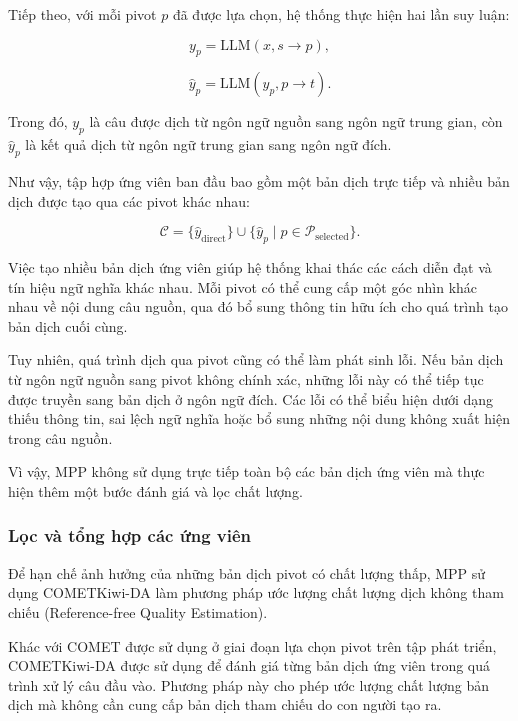 Tiếp theo, với mỗi pivot $p$ đã được lựa chọn, hệ thống thực hiện hai lần suy luận:

\begin{equation}
	y_p
	=
	\mathrm{LLM}(x,s\rightarrow p),
\end{equation}

\begin{equation}
	\hat{y}_p
	=
	\mathrm{LLM}(y_p,p\rightarrow t).
\end{equation}

Trong đó, $y_p$ là câu được dịch từ ngôn ngữ nguồn sang ngôn ngữ trung gian, còn $\hat{y}_p$ là kết quả dịch từ ngôn ngữ trung gian sang ngôn ngữ đích.

Như vậy, tập hợp ứng viên ban đầu bao gồm một bản dịch trực tiếp và nhiều bản dịch được tạo qua các pivot khác nhau:

\begin{equation}
	\mathcal{C}
	=
	\{\hat{y}_{\mathrm{direct}}\}
	\cup
	\{\hat{y}_p\mid p\in\mathcal{P}_{\mathrm{selected}}\}.
\end{equation}

Việc tạo nhiều bản dịch ứng viên giúp hệ thống khai thác các cách diễn đạt và tín hiệu ngữ nghĩa khác nhau. Mỗi pivot có thể cung cấp một góc nhìn khác nhau về nội dung câu nguồn, qua đó bổ sung thông tin hữu ích cho quá trình tạo bản dịch cuối cùng.

Tuy nhiên, quá trình dịch qua pivot cũng có thể làm phát sinh lỗi. Nếu bản dịch từ ngôn ngữ nguồn sang pivot không chính xác, những lỗi này có thể tiếp tục được truyền sang bản dịch ở ngôn ngữ đích. Các lỗi có thể biểu hiện dưới dạng thiếu thông tin, sai lệch ngữ nghĩa hoặc bổ sung những nội dung không xuất hiện trong câu nguồn.

Vì vậy, MPP không sử dụng trực tiếp toàn bộ các bản dịch ứng viên mà thực hiện thêm một bước đánh giá và lọc chất lượng.

\subsubsection*{Lọc và tổng hợp các ứng viên}

Để hạn chế ảnh hưởng của những bản dịch pivot có chất lượng thấp, MPP sử dụng COMETKiwi-DA làm phương pháp ước lượng chất lượng dịch không tham chiếu (Reference-free Quality Estimation).

Khác với COMET được sử dụng ở giai đoạn lựa chọn pivot trên tập phát triển, COMETKiwi-DA được sử dụng để đánh giá từng bản dịch ứng viên trong quá trình xử lý câu đầu vào. Phương pháp này cho phép ước lượng chất lượng bản dịch mà không cần cung cấp bản dịch tham chiếu do con người tạo ra.

